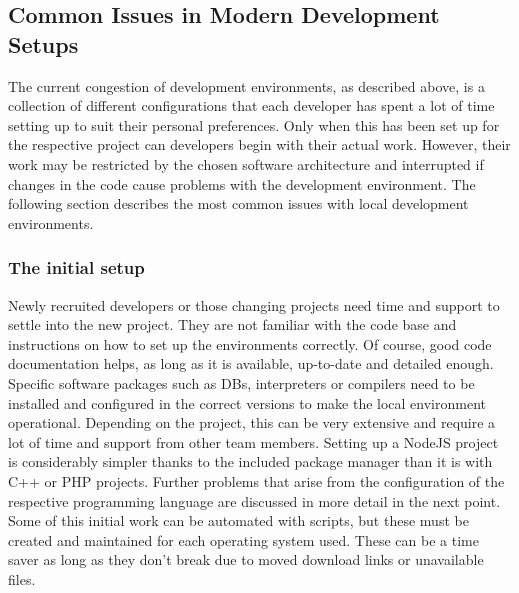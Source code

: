 \documentclass[12pt, a4paper]{article}
\begin{document}
    \subsection{Common Issues in Modern Development Setups}
    The current congestion of development environments, as described above, is a collection of different configurations that each developer has spent a lot of time setting up to suit their personal preferences. Only when this has been set up for the respective project can developers begin with their actual work. However, their work may be restricted by the chosen software architecture and interrupted if changes in the code cause problems with the development environment. The following section describes the most common issues with local development environments.

        \subsubsection{The initial setup}\label{sss::initial}
        Newly recruited developers or those changing projects need time and support to settle into the new project. They are not familiar with the code base and instructions on how to set up the environments correctly. Of course, good code documentation helps, as long as it is available, up-to-date and detailed enough. Specific software packages such as \ac{DB}s, interpreters or compilers need to be installed and configured in the correct versions to make the local environment operational. Depending on the project, this can be very extensive and require a lot of time and support from other team members. Setting up a NodeJS project is considerably simpler thanks to the included package manager  than it is with C++ or PHP projects. Further problems that arise from the configuration of the respective programming language are discussed in more detail in the next point. \newline
        Some of this initial work can be automated with scripts, but these must be created and maintained for each operating system used. These can be a time saver as long as they don't break due to moved download links or unavailable files.
\end{document}

